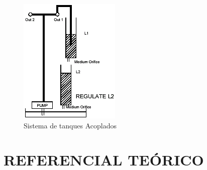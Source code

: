 \documentclass[a4paper,12pt]{article}
\begin{document}
\begin{flushleft}
\begin{flushleft}
\end{flushleft}

\begin{figure}[h]
    \centering
    \includegraphics{images/1_relatorio/config_2.png}
    \caption{Sistema de tanques Acoplados}
    \label{fig:sistema_de_tanques_acoplados}
\end{figure}

 
 

\end{flushleft}

\newpage


\thispagestyle{main}

\section{REFERENCIAL TEÓRICO}


\end{document}
